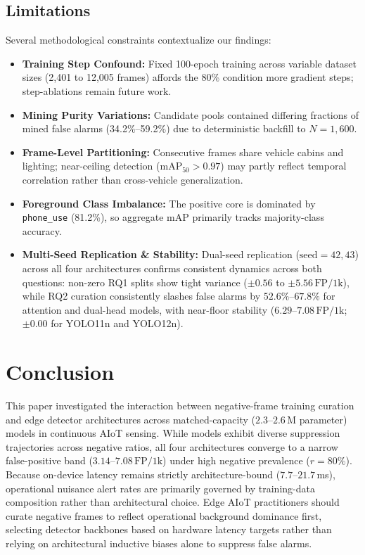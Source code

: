 \documentclass[conference]{IEEEtran}
\begin{document}
\subsection{Limitations}
Several methodological constraints contextualize our findings:
\begin{itemize}\setlength{\itemsep}{0pt}\setlength{\parskip}{0pt}\setlength{\parsep}{0pt}
\item \textbf{Training Step Confound:} Fixed 100-epoch training across variable dataset sizes (2,401 to 12,005 frames) affords the 80\% condition more gradient steps; step-ablations remain future work.
\item \textbf{Mining Purity Variations:} Candidate pools contained differing fractions of mined false alarms (34.2\%--59.2\%) due to deterministic backfill to $N{=}1{,}600$.
\item \textbf{Frame-Level Partitioning:} Consecutive frames share vehicle cabins and lighting; near-ceiling detection ($\mathrm{mAP}_{50} > 0.97$) may partly reflect temporal correlation rather than cross-vehicle generalization.
\item \textbf{Foreground Class Imbalance:} The positive core is dominated by \texttt{phone\_use} (81.2\%), so aggregate mAP primarily tracks majority-class accuracy.
\item \textbf{Multi-Seed Replication \& Stability:} Dual-seed replication ($\text{seed}{=}42, 43$) across all four architectures confirms consistent dynamics across both questions: non-zero RQ1 splits show tight variance ($\pm 0.56$ to $\pm 5.56\,\mathrm{FP/1k}$), while RQ2 curation consistently slashes false alarms by $52.6\%$--$67.8\%$ for attention and dual-head models, with near-floor stability ($6.29$--$7.08\,\mathrm{FP/1k}$; $\pm 0.00$ for YOLO11n and YOLO12n).
\end{itemize}

\section{Conclusion}
\label{sec:conclusion}
This paper investigated the interaction between negative-frame training curation and edge detector architectures across matched-capacity ($2.3$--$2.6$\,M parameter) models in continuous AIoT sensing. While models exhibit diverse suppression trajectories across negative ratios, all four architectures converge to a narrow false-positive band ($3.14$--$7.08\,\mathrm{FP/1k}$) under high negative prevalence ($r{=}80\%$). Because on-device latency remains strictly architecture-bound ($7.7$--$21.7$\,ms), operational nuisance alert rates are primarily governed by training-data composition rather than architectural choice. Edge AIoT practitioners should curate negative frames to reflect operational background dominance first, selecting detector backbones based on hardware latency targets rather than relying on architectural inductive biases alone to suppress false alarms.
\end{document}
